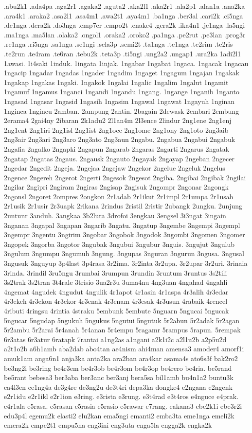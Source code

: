 {.abu2k1 .ada4pa .aga2r1 .agaka2 .aguta2 .aka2l1 .aka2r1 .ala2p1 .alan1a .ana2ka .ara4k1 .araka2 .asa2l1 .asa4m1 .awa2t1 .aya4m1 .ba1nga .ber3al .cari2k .ci5nga .de1nga .dera2k .do3nga .emp7er .empo2t .enake4 .gera2k .ika4n1 .je1nga .la5ngi .ma1nga .ma5lan .olaka2 .ongol1 .oraka2 .oroko2 .pa1nga .pe2rut .pe3lan .prog3r .re1nga .ri5nga .sa1nga .se1ngi .sela3p .semi2t .ta1nga .te1nga .te2rim .te2ris .te2run .te4ram .te6ran .tebu2k .teta3p .ti5ngi .ung2a2 .ungap1 .ura2ka 1adi2l1 1awasi. 1i4saki 1induk. 1ingata 1injak. 1ngabar 1ngabat 1ngaca. 1ngacak 1ngacau 1ngacip 1ngadar 1ngadas 1ngader 1ngadim 1ngaget 1ngagum 1ngajan 1ngakak 1ngakap 1ngakas 1ngaki. 1ngakok 1ngalai 1ngalic 1ngalim 1ngalut 1ngamit 1ngamuf 1ngamus 1nganci 1ngandi 1ngandu 1ngang. 1ngange 1nganib 1nganto 1ngasad 1ngasar 1ngasid 1ngasih 1ngasim 1ngawal 1ngawat 1ngayuh 1nginan 1nginca 1ngincu 2amban. 2ampung 2antin. 2bagain 2dewask 2embari 2embung 2erama4 2gai4ny 2ibaran 2k1adu2 2l1an4m 2l3ence 2lindur 2ng1ene 2ng1enj 2ng1ent 2ng1iri 2ng1isl 2ng1ist 2ng1oce 2ng1ome 2ng1ony 2ng1oto 2ng3aib 2ng3air 2ng3ari 2ng3aro 2ng3ato 2ng3aun 2ngabu. 2ngabua 2ngabui 2ngabuk 2ngafia 2ngalko 2ngapki 2ngapun 2ngarab 2ngaras 2ngarti 2ngarus 2ngatak 2ngatap 2ngatas 2ngaus. 2ngausk 2ngauto 2ngayak 2ngayap 2ngeban 2ngecer 2ngedar 2ngedit 2ngeja. 2ngejaa 2ngejaw 2ngekor 2ngelue 2ngeluk 2ngelus 2ngence 2ngereh 2ngerot 2ngerti 2ngesok 2ngesot 2ngiba. 2ngibai 2ngibak 2ngilai 2ngilar 2ngipri 2ngiram 2ngiras 2ngisap 2ngisuk 2ngompr 2ngonar 2ngongk 2ngonsl 2ngoret 2ompres 2ongkon 2r1adab 2r1ikut 2r1impl 2r1umpa 2r1usah 2r1usik 2r1usir 2r3uapk 2rikana 2rindus 2ristil 2ristir 2ubangk 2ungku. 2unjung 2untunr 3anduh. 3angkaa 3b2lura 3drofoi 3engkau 3engsel 3i3ngat 3ingain 3nganan 3ngapal 3ngapan 3ngarib 3ngatu. 3ngatup 3ngembe 3ngempi 3ngempl 3ngempr 3ngentu 3ngirim 3ngobar 3ngobok 3ngodok 3ngombi 3ngomen 3ngomer 3ngopek 3ngorba 3ngotor 3ngubak 3ngubui 3ngubur 3nguis. 3ngujut 3ngulub 3ngulum 3ngumpu 3ngumuh 3ngung. 3ngupas 3nguran 3ngurun 3ngusa. 3ngusal 3ngusuk 3nguyup 3p4last 3p4rasa 3r2ima. 3r2inta 3r2upa. 3r2upar 3r2uri. 3rinaia 3rinda. 3rindil 3ru5ngu 3rumbai 3rumpun 3rundin 3runtum 3runtus 3s2tili 3s2trak 3s2tran 3t4rale 3trisio 3ua2r3u 3uma4nu 4ng3uan 4ngahad 4ngahli 4ngemat 4ngudek 4ngudut 4ngulik 4r1apot 4r1asin 4r1aspa 4r3alih 4r3edar 4r3ekeh 4r3ekon 4r3ekor 4r3enak 4r3enam 4r3esak 4r3usun 4rabaik 4rencel 4ributi 4ringsu 4rintia 4straku 5embunk 5embute 5nguarn 5ngucai 5ngucak 5ngucar 5ngudap 5ngukuh 5ngukus 5ngutui 5ngutuk 5r2abun 5r2adak 5r2agan 5r2ambu 5r2arai 5r4anah 5r4anan 5r4empu 5ragamr 5rampus 5rapun. 5rempak 6r3atas 6r3atur 6ratapk 7rantai a1ng2as a1ngani a2k1i2c a2l1u2b a2p5u2d a2t1o2b a6h1amb aba2dab abo4tan ae4nism ahi4man amensa3 amoder4 amorf1i amuk1am anga6n1 anja3ka anta2ka ara2ban ara4kar asama4s ato6s3f bak2ro2 be3ng2i be3ring be4r3em be4r3ob be4r3om be4r3op be4rero be4ria. be5rand be5rant bebesa3 ber3aba ber3anc ber3anj bera5sa bil1amb bu4n1a2 buntu3k ca4l3en ce1ng4a de3g4re de3ng2u de3t4ri depa3ka dongke4 e2ngana e2ngenk e2r1idu e2r1ikl e2r1ion e3ring. e3rista e3rung. e3t4rad e3t4ros e4nguce e4prak. e4r1ala e5rasa. e5rasan e5rasia e5rasio e5rawar e7rang. eakana3 ebe2k1i ebe3r2i edu3p4l egemu2k elasti2 elu2kan ema5ngi emanti2 emba3ta eme1nga emeli2k emera2k empe2t1 empu5na eng3ini eng3uta enga5la engga2k engka2k }
